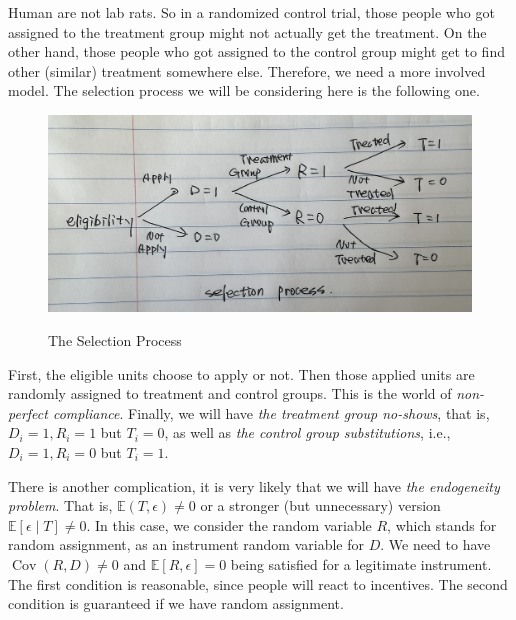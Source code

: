 \documentclass[11pt,a4paper]{amsart}
\theoremstyle{plain}
\theoremstyle{definition}
\begin{document}
Human are not lab rats. So in a randomized control trial, those people who got assigned to the treatment group might not actually get the treatment. On the other hand, those people who got assigned to the control group might get to find other (similar) treatment somewhere else. Therefore, we need a more involved model. The selection process we will be considering here is the following one.

\begin{figure}[hbt]
{\centering \includegraphics[scale=0.78]{Figures/applied_rct_selection}}
\caption{The Selection Process}\label{F:selection}
\end{figure}

First, the eligible units choose to apply or not. Then those applied units are randomly assigned to treatment and control groups. This is the world of \textit{non-perfect compliance}. Finally, we will have \textit{the treatment group no-shows}, that is, $D_{i} = 1, R_{i} = 1$ but $T_{i} = 0$, as well as \textit{the control group substitutions}, i.e., $D_{i} = 1, R_{i} = 0$ but $T_{i} = 1$. 

There is another complication, it is very likely that we will have \textit{the endogeneity problem}. That is, $\mathbb{E}(T, \epsilon) \ne 0$ or a stronger (but unnecessary) version $\mathbb{E}[\epsilon \mid T] \ne 0$. In this case, we consider the random variable $R$, which stands for random assignment, as an instrument random variable for $D$. We need to have $\operatorname{Cov}(R, D) \ne 0$ and $\mathbb{E}[R, \epsilon] = 0$ being satisfied for a legitimate instrument. The first condition is reasonable, since people will react to incentives. The second condition is guaranteed if we have random assignment.
\end{document}
